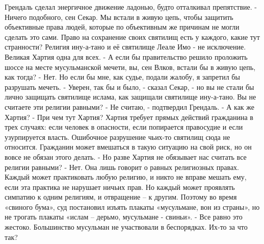 \documentclass{book}
\begin{document}
Грендаль сделал энергичное движение ладонью, будто отталкивал препятствие.
- Ничего подобного, сен Секар. Мы встали в живую цепь, чтобы защитить объективные права людей, которые по объективным же причинам не могли сделать это сами. Право на сохранение своих святилищ есть у каждого, какие тут странности? Религия ину-а-тано и её святилище Леале Имо - не исключение. Великая Хартия одна для всех.
- А если бы правительство решило проложить шоссе на месте мусульманской мечети, вы, сен Влков, встали бы в живую цепь, как тогда?
- Нет. Но если бы мне, как судье, подали жалобу, я запретил бы разрушать мечеть.
- Уверен, так бы и было, - сказал Секар, - но вы не стали бы лично защищать святилище ислама, как защищали святилище ину-а-тано. Вы не считаете эти религии равными?
- Не считаю, - подтвердил Грендаль.
- А как же Хартия?
- При чем тут Хартия? Хартия требует прямых действий гражданина в трех случаях: если человек в опасности, если попирается правосудие и если узурпируется власть. Ошибочное разрушение чьих-то святилищ сюда не относится. Гражданин может вмешаться в такую ситуацию на свой риск, но он вовсе не обязан этого делать.
- Но разве Хартия не обязывает нас считать все религии равными?
- Нет. Она лишь говорит о равных религиозных правах. Каждый может практиковать любую религию, и никто не вправе мешать ему, если эта практика не нарушает ничьих прав. Но каждый может проявлять симпатию к одним религиям, и отвращение -- к другим. Поэтому во время «свиного бума», суд постановил изъять плакаты «мусульмане, вон из страны», но не трогать плакаты «ислам -- дерьмо, мусульмане - свиньи».
- Все равно это жестоко. Большинство мусульман не участвовали в беспорядках. Их-то за что так?
\end{document}
